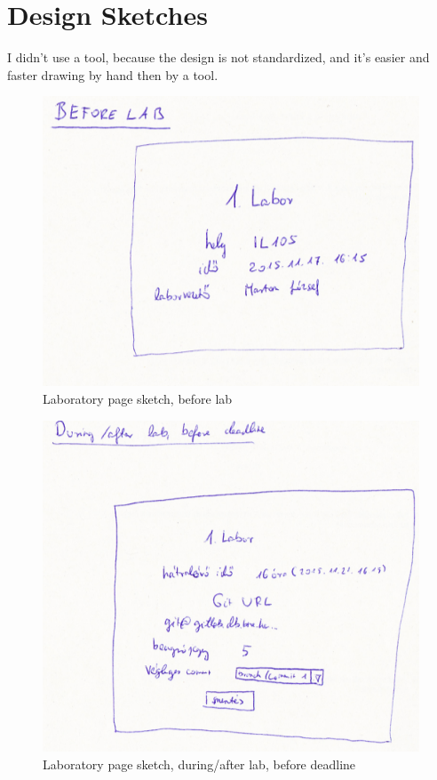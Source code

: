\chapter{Design Sketches}
\label{appendix-design-sketches}

I didn't use a tool, because the design is not standardized, and it's easier and faster drawing by hand then by a tool.

%
\begin{figure}[!ht]
	\includegraphics[width=\textwidth]{figures/sketch5.png}
	\caption{Laboratory page sketch, before lab}
	\label{fig:sketch5}
\end{figure}

\begin{figure}[!ht]
	\includegraphics[width=\textwidth]{figures/sketch3.png}
	\caption{Laboratory page sketch, during/after lab, before deadline}
	\label{fig:sketch3}
\end{figure}

